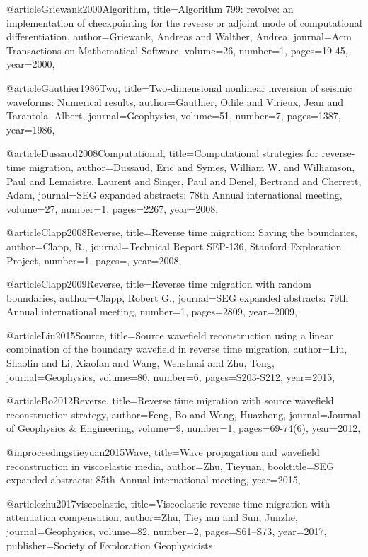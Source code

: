 {@article{Griewank2000Algorithm,
  title={Algorithm 799: revolve: an implementation of checkpointing for the reverse or adjoint mode of computational differentiation},
  author={Griewank, Andreas and Walther, Andrea},
  journal={Acm Transactions on Mathematical Software},
  volume={26},
  number={1},
  pages={19-45},
  year={2000},
}

@article{Gauthier1986Two,
  title={Two‐dimensional nonlinear inversion of seismic waveforms: Numerical results},
  author={Gauthier, Odile and Virieux, Jean and Tarantola, Albert},
  journal={Geophysics},
  volume={51},
  number={7},
  pages={1387},
  year={1986},
}

@article{Dussaud2008Computational,
  title={Computational strategies for reverse-time migration},
  author={Dussaud, Eric and Symes, William W. and Williamson, Paul and Lemaistre, Laurent and Singer, Paul and Denel, Bertrand and Cherrett, Adam},
  journal={SEG expanded abstracts: 78th Annual international meeting},
  volume={27},
  number={1},
  pages={2267},
  year={2008},
}

@article{Clapp2008Reverse,
  title={Reverse time migration: Saving the boundaries},
  author={Clapp, R.},
  journal={Technical Report SEP-136, Stanford Exploration Project},
  number={1},
  pages={},
  year={2008},
}

@article{Clapp2009Reverse,
  title={Reverse time migration with random boundaries},
  author={Clapp, Robert G.},
  journal={SEG expanded abstracts: 79th Annual international meeting},
  number={1},
  pages={2809},
  year={2009},
}

@article{Liu2015Source,
  title={Source wavefield reconstruction using a linear combination of the boundary wavefield in reverse time migration},
  author={Liu, Shaolin and Li, Xiaofan and Wang, Wenshuai and Zhu, Tong},
  journal={Geophysics},
  volume={80},
  number={6},
  pages={S203-S212},
  year={2015},
}

@article{Bo2012Reverse,
  title={Reverse time migration with source wavefield reconstruction strategy},
  author={Feng, Bo and Wang, Huazhong},
  journal={Journal of Geophysics \& Engineering},
  volume={9},
  number={1},
  pages={69-74(6)},
  year={2012},
}

@inproceedings{tieyuan2015Wave,
  title={Wave propagation and wavefield reconstruction in viscoelastic media},
  author={Zhu, Tieyuan},
  booktitle={SEG expanded abstracts: 85th Annual international meeting},
  year={2015},
}

@article{zhu2017viscoelastic,
  title={Viscoelastic reverse time migration with attenuation compensation},
  author={Zhu, Tieyuan and Sun, Junzhe},
  journal={Geophysics},
  volume={82},
  number={2},
  pages={S61--S73},
  year={2017},
  publisher={Society of Exploration Geophysicists}
}


}
